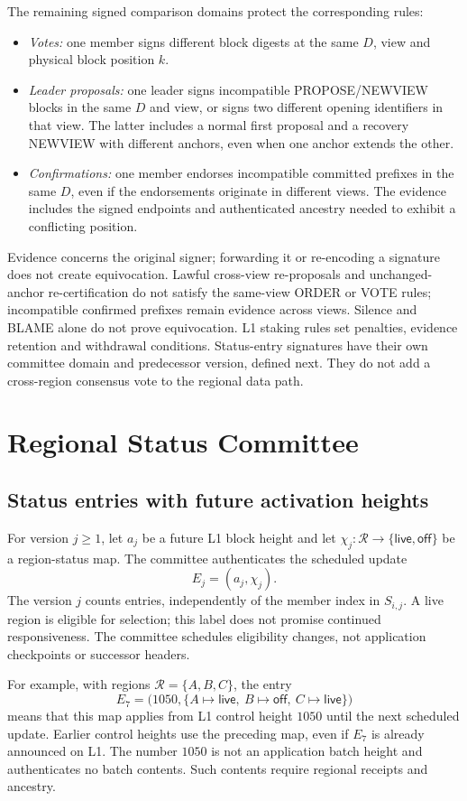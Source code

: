 \documentclass[11pt,a4paper,onecolumn]{article}
\newcommand{\Tag}[1]{\ensuremath{\mathsf{#1}}}
\begin{document}
The remaining signed comparison domains protect the corresponding rules:
\begin{itemize}
\item \emph{Votes:} one member signs different block digests at the same
$D$, view and physical block position $k$.
\item \emph{Leader proposals:} one leader signs incompatible
PROPOSE/NEWVIEW blocks in the same $D$ and view, or signs two different
opening identifiers in that view. The latter includes a normal first
proposal and a recovery NEWVIEW with different anchors, even when one
anchor extends the other.
\item \emph{Confirmations:} one member endorses incompatible committed
prefixes in the same $D$, even if the endorsements originate in different
views. The evidence includes the signed endpoints and authenticated ancestry
needed to exhibit a conflicting position.
\end{itemize}
Evidence concerns the original signer; forwarding it or re-encoding a
signature does not create equivocation. Lawful cross-view re-proposals and
unchanged-anchor re-certification do not satisfy the same-view ORDER or VOTE
rules; incompatible confirmed prefixes remain evidence across views.
Silence and BLAME alone do not prove equivocation. L1 staking rules set
penalties, evidence retention and withdrawal conditions.
Status-entry signatures have their own committee domain and predecessor
version, defined next. They do not add a cross-region consensus vote to
the regional data path.


\section{Regional Status Committee}\label{sec:committee}
\subsection{Status entries with future activation heights}
For version $j\geq1$, let $a_j$ be a future L1 block height and let
$\chi_j:\mathcal R\to\{\Tag{live},\Tag{off}\}$ be a region-status map.
The committee authenticates the scheduled update
\[
 E_j=(a_j,\chi_j).
\]
The version $j$ counts entries, independently of the member index in
$S_{i,j}$. A live region is eligible for selection; this label does not
promise continued responsiveness. The committee schedules eligibility
changes, not application checkpoints or successor headers.

For example, with regions $\mathcal R=\{A,B,C\}$, the entry
\[
 E_7=\bigl(1050,\{A\mapsto\Tag{live},\ B\mapsto\Tag{off},
 \ C\mapsto\Tag{live}\}\bigr)
\]
means that this map applies from L1 control height $1050$ until the next
scheduled update. Earlier control heights use the preceding map, even if
$E_7$ is already announced on L1. The number $1050$ is not an application
batch height and authenticates no batch contents. Such contents require
regional receipts and ancestry.
\end{document}
